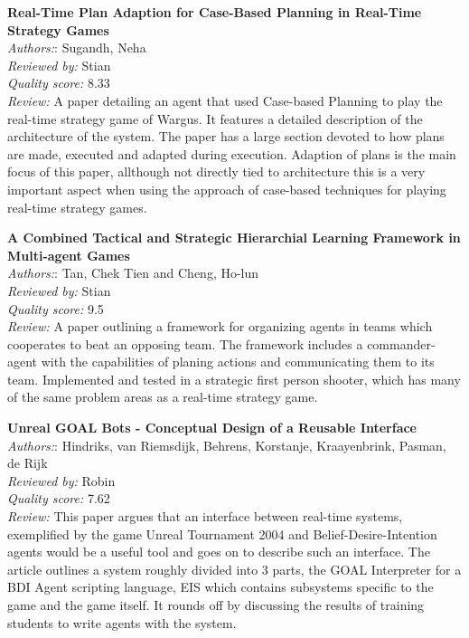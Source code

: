 \textbf{Real-Time Plan Adaption for Case-Based Planning in Real-Time Strategy Games}\\
\textit{Authors:}: Sugandh, Neha\\
\textit{Reviewed by:} Stian\\
\textit{Quality score:} 8.33\\
\textit{Review:} A paper detailing an agent that used Case-based Planning to play the real-time strategy game of Wargus. It features a detailed description of the architecture of the system. The paper has a large section devoted to how plans are made, executed and adapted during execution. Adaption of plans is the main focus of this paper, allthough not directly tied to architecture this is a very important aspect when using the approach of case-based techniques for playing real-time strategy games.

\textbf{A Combined Tactical and Strategic Hierarchial Learning Framework in Multi-agent Games}\\
\textit{Authors:}: Tan, Chek Tien and Cheng, Ho-lun\\
\textit{Reviewed by:} Stian\\
\textit{Quality score:} 9.5\\
\textit{Review:} A paper outlining a framework for organizing agents in teams which cooperates to beat an opposing team. The framework includes a commander-agent with the capabilities of planing actions and communicating them to its team. Implemented and tested in a strategic first person shooter, which has many of the same problem areas as a real-time strategy game.
 
\textbf{Unreal GOAL Bots - Conceptual Design of a Reusable Interface}\\
\textit{Authors:}: Hindriks, van Riemsdijk, Behrens, Korstanje, Kraayenbrink, Pasman, de Rijk\\
\textit{Reviewed by:} Robin\\
\textit{Quality score:} 7.62\\
\textit{Review:} This paper argues that an interface between real-time systems, exemplified by the game Unreal Tournament 2004 and Belief-Desire-Intention agents would be a useful tool and goes on to describe such an interface. The article outlines a system roughly divided into 3 parts, the GOAL Interpreter for a BDI Agent scripting language, EIS which contains subsystems specific to the game and the game itself. It rounds off by discussing the results of training students to write agents with the system.

